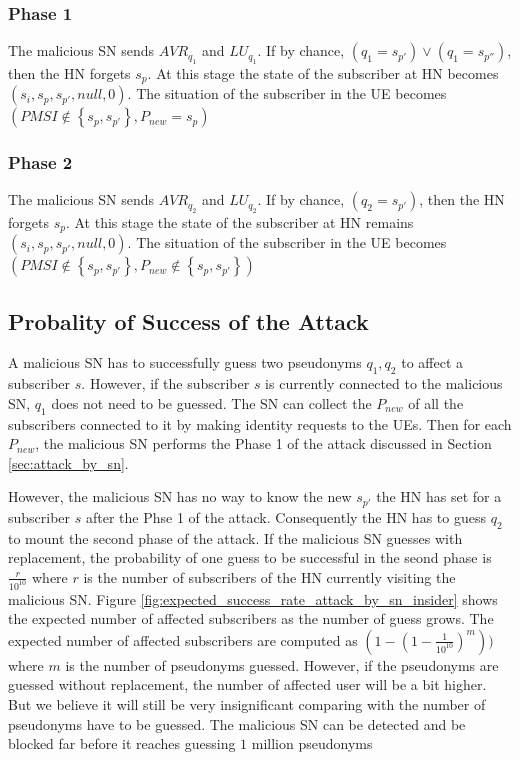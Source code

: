 \documentclass{llncs} %
\begin{document}
\subsubsection{Phase 1}  The malicious SN sends $AVR_{q_1}$ and $LU_{q_1}$. If by chance, $\left(q_1 = s_{p'} \right) \vee \left(q_1 = s_{p''}\right)$, then the HN forgets $s_p$. At this stage the state of the subscriber at HN becomes $(s_i,s_p,s_{p'},null,0)$. The situation of the subscriber in the UE becomes $\left(PMSI \notin \left\lbrace s_p,s_{p'} \right\rbrace, P_{new} = s_{p} \right)$

\subsubsection{Phase 2} The malicious SN sends $AVR_{q_2}$ and $LU_{q_2}$. If by chance, $\left(q_2 = s_{p'} \right)$, then the HN forgets $s_p$. At this stage the state of the subscriber at HN remains $(s_i,s_p,s_{p'},null,0)$. The situation of the subscriber in the UE becomes $\left(PMSI \notin \left\lbrace s_p,s_{p'} \right\rbrace, P_{new} \notin \left\lbrace s_p, s_{p'}  \right\rbrace \right)$

\subsection{Probality of Success of the Attack}
A malicious SN has to successfully guess two pseudonyms $q_1,q_2$ to affect a subscriber $s$. However, if the subscriber $s$ is currently connected to the malicious SN, $q_1$ does not need to be guessed. The SN can collect the $P_{new}$ of all the subscribers connected to it by making identity requests to the UEs. Then for each $P_{new}$, the malicious SN performs the Phase 1 of the attack discussed in Section \ref{sec:attack_by_sn}. 

However, the malicious SN has no way to know the new $s_{p'}$ the HN has set for a subscriber $s$ after the Phse 1 of the attack. Consequently the HN has to guess $q_2$ to mount the second phase of the attack. If the malicious SN guesses with replacement, the probability of one guess to be successful in the seond phase is $\frac{r}{10^10}$ where $r$ is the number of subscribers of the HN currently visiting the malicious SN. Figure \ref{fig:expected_success_rate_attack_by_sn_insider} shows the expected number of affected subscribers as the number of guess grows. The expected number of affected subscribers are computed as $\left(1-\left(1-\frac{1}{10^{10}}\right)^m\right))$ where $m$ is the number of pseudonyms guessed. However, if the pseudonyms are guessed without replacement, the number of affected user will be a bit higher. But we believe it will still be very insignificant comparing with the number of pseudonyms have to be guessed. The malicious SN can be detected and be blocked far before it reaches guessing $1$ million pseudonyms 
\end{document}
